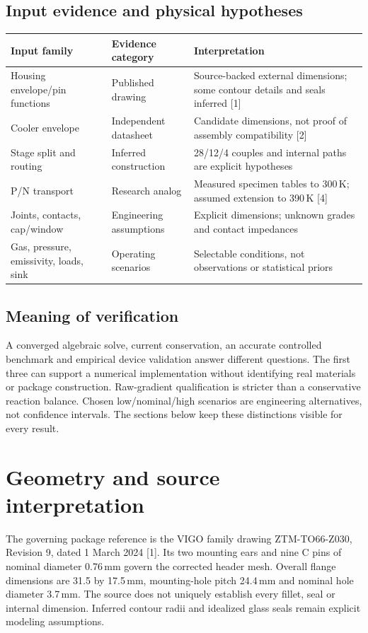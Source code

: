 \documentclass[11pt,a4paper]{article}
\begin{document}
\subsection{Input evidence and physical hypotheses}
\begin{tabularx}{\linewidth}{p{31mm}p{29mm}X}\toprule
Input family & Evidence category & Interpretation\\\midrule
Housing envelope/pin functions & Published drawing & Source-backed external dimensions; some contour details and seals inferred [1]\\
Cooler envelope & Independent datasheet & Candidate dimensions, not proof of assembly compatibility [2]\\
Stage split and routing & Inferred construction & 28/12/4 couples and internal paths are explicit hypotheses\\
P/N transport & Research analog & Measured specimen tables to 300\,K; assumed extension to 390\,K [4]\\
Joints, contacts, cap/window & Engineering assumptions & Explicit dimensions; unknown grades and contact impedances\\
Gas, pressure, emissivity, loads, sink & Operating scenarios & Selectable conditions, not observations or statistical priors\\\bottomrule
\end{tabularx}

\subsection{Meaning of verification}
A converged algebraic solve, current conservation, an accurate controlled benchmark and empirical device validation answer different questions. The first three can support a numerical implementation without identifying real materials or package construction. Raw-gradient qualification is stricter than a conservative reaction balance. Chosen low/nominal/high scenarios are engineering alternatives, not confidence intervals. The sections below keep these distinctions visible for every result.
\clearpage
\section{Geometry and source interpretation}
The governing package reference is the VIGO family drawing ZTM-TO66-Z030, Revision 9, dated 1 March 2024 [1]. Its two mounting ears and nine C pins of nominal diameter 0.76\,mm govern the corrected header mesh. Overall flange dimensions are 31.5 by 17.5\,mm, mounting-hole pitch 24.4\,mm and nominal hole diameter 3.7\,mm. The source does not uniquely establish every fillet, seal or internal dimension. Inferred contour radii and idealized glass seals remain explicit modeling assumptions.
\end{document}
